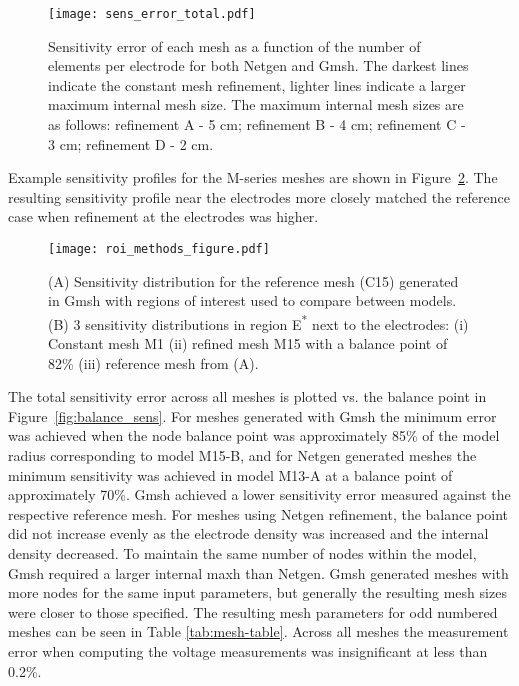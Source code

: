 \documentclass[12pt]{iopart}
\begin{document}
\begin{figure}
  \texttt{[image: sens\_error\_total.pdf]}
  \caption{\label{fig:results_sens_original} Sensitivity error of each mesh as a function 
  of the number of elements per electrode for both Netgen and Gmsh. The darkest lines indicate the
  constant mesh refinement, lighter lines indicate a larger maximum internal mesh size. The maximum
  internal mesh sizes are as follows: refinement A - 5 cm; refinement B - 4 cm; refinement C - 3 cm;
  refinement D - 2 cm.}
\end{figure}


Example sensitivity profiles for the M-series meshes are shown in Figure~\ref{fig:roiMethods}.
The resulting sensitivity profile near the electrodes more closely matched the reference case 
when refinement at the electrodes was higher. 

\begin{figure}
  \texttt{[image: roi\_methods\_figure.pdf]}
  \caption{\label{fig:roiMethods} (A) Sensitivity distribution for the reference mesh
  (C15) generated in Gmsh with regions of interest used to compare between models. 
  (B) 3 sensitivity distributions in region E\textsuperscript{*} next to the electrodes: (i) Constant mesh M1
  (ii) refined mesh M15 with a balance point of 82\% (iii) reference mesh from (A).
  }
\end{figure}

The total sensitivity error across all meshes is plotted vs. the balance point in
Figure~\ref{fig:balance_sens}. For meshes generated with Gmsh the minimum error was 
achieved when the node balance point was approximately 85\% of the model radius corresponding
to model M15-B, 
and for Netgen generated meshes the minimum sensitivity was achieved in model M13-A at a balance point
of approximately 70\%. Gmsh achieved a lower sensitivity error measured against
the respective reference mesh. For meshes using Netgen refinement, the balance point did not
increase evenly as the electrode density was increased and the internal density decreased. 
To maintain the same number of nodes within the model, Gmsh required a larger internal maxh
than Netgen. Gmsh generated meshes with more nodes for the same input
parameters, but  generally the resulting mesh sizes were closer to those specified. The
resulting mesh parameters for odd numbered meshes can be seen in Table \ref{tab:mesh-table}.
Across all meshes the measurement error when computing the voltage measurements was insignificant
at less than 0.2\%.
\end{document}

